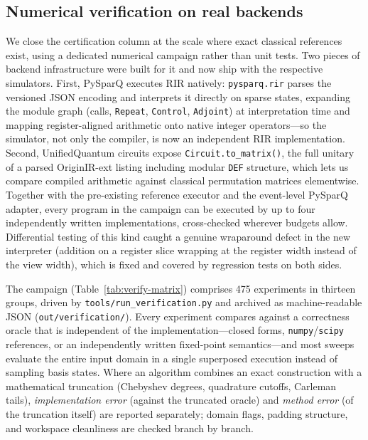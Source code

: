 \begin{table}[t]
\begin{tabular}{@{}p{4.3cm}cccc@{}}
  \end{tabular}
\end{table}

\subsection{Numerical verification on real backends}
\label{sec:numverify}

We close the certification column at the scale where exact classical
references exist, using a dedicated numerical campaign rather than unit
tests.  Two pieces of backend infrastructure were built for it and now ship
with the respective simulators.  First, PySparQ executes RIR natively:
\texttt{pysparq.rir} parses the versioned JSON encoding and interprets it
directly on sparse states, expanding the module graph (calls,
\texttt{Repeat}, \texttt{Control}, \texttt{Adjoint}) at interpretation time
and mapping register-aligned arithmetic onto native integer operators---so
the simulator, not only the compiler, is now an independent RIR
implementation.  Second, UnifiedQuantum circuits expose
\texttt{Circuit.to\_matrix()}, the full unitary of a parsed OriginIR-ext
listing including modular \texttt{DEF} structure, which lets us compare
compiled arithmetic against classical permutation matrices elementwise.
Together with the pre-existing reference executor and the event-level
PySparQ adapter, every program in the campaign can be executed by up to
four independently written implementations, cross-checked wherever budgets
allow.  Differential testing of this kind caught a genuine wraparound
defect in the new interpreter (addition on a register slice wrapping at the
register width instead of the view width), which is fixed and covered by
regression tests on both sides.

The campaign (Table~\ref{tab:verify-matrix}) comprises 475 experiments in
thirteen groups, driven by \texttt{tools/run\_verification.py} and archived
as machine-readable JSON (\texttt{out/verification/}).  Every experiment
compares against a correctness oracle that is independent of the
implementation---closed forms, \texttt{numpy}/\texttt{scipy} references, or
an independently written fixed-point semantics---and most sweeps evaluate
the entire input domain in a single superposed execution instead of
sampling basis states.  Where an algorithm combines an exact construction
with a mathematical truncation (Chebyshev degrees, quadrature cutoffs,
Carleman tails), \emph{implementation error} (against the truncated oracle)
and \emph{method error} (of the truncation itself) are reported separately;
domain flags, padding structure, and workspace cleanliness are checked
branch by branch.

